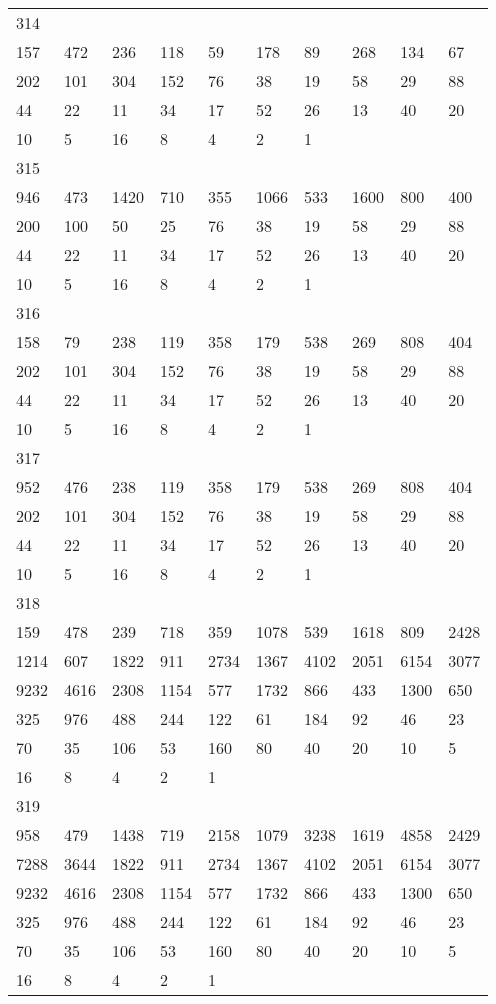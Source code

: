 \begin{longtable}{*{10}{l}}
314&&&&&&&&&\\
157& 472& 236& 118& 59& 178& 89& 268& 134& 67\\
202& 101& 304& 152& 76& 38& 19& 58& 29& 88\\
44& 22& 11& 34& 17& 52& 26& 13& 40& 20\\
10& 5& 16& 8& 4& 2& 1& \\

315&&&&&&&&&\\
946& 473& 1420& 710& 355& 1066& 533& 1600& 800& 400\\
200& 100& 50& 25& 76& 38& 19& 58& 29& 88\\
44& 22& 11& 34& 17& 52& 26& 13& 40& 20\\
10& 5& 16& 8& 4& 2& 1& \\

316&&&&&&&&&\\
158& 79& 238& 119& 358& 179& 538& 269& 808& 404\\
202& 101& 304& 152& 76& 38& 19& 58& 29& 88\\
44& 22& 11& 34& 17& 52& 26& 13& 40& 20\\
10& 5& 16& 8& 4& 2& 1& \\

317&&&&&&&&&\\
952& 476& 238& 119& 358& 179& 538& 269& 808& 404\\
202& 101& 304& 152& 76& 38& 19& 58& 29& 88\\
44& 22& 11& 34& 17& 52& 26& 13& 40& 20\\
10& 5& 16& 8& 4& 2& 1& \\

318&&&&&&&&&\\
159& 478& 239& 718& 359& 1078& 539& 1618& 809& 2428\\
1214& 607& 1822& 911& 2734& 1367& 4102& 2051& 6154& 3077\\
9232& 4616& 2308& 1154& 577& 1732& 866& 433& 1300& 650\\
325& 976& 488& 244& 122& 61& 184& 92& 46& 23\\
70& 35& 106& 53& 160& 80& 40& 20& 10& 5\\
16& 8& 4& 2& 1& \\

319&&&&&&&&&\\
958& 479& 1438& 719& 2158& 1079& 3238& 1619& 4858& 2429\\
7288& 3644& 1822& 911& 2734& 1367& 4102& 2051& 6154& 3077\\
9232& 4616& 2308& 1154& 577& 1732& 866& 433& 1300& 650\\
325& 976& 488& 244& 122& 61& 184& 92& 46& 23\\
70& 35& 106& 53& 160& 80& 40& 20& 10& 5\\
16& 8& 4& 2& 1& \\


\end{longtable}
